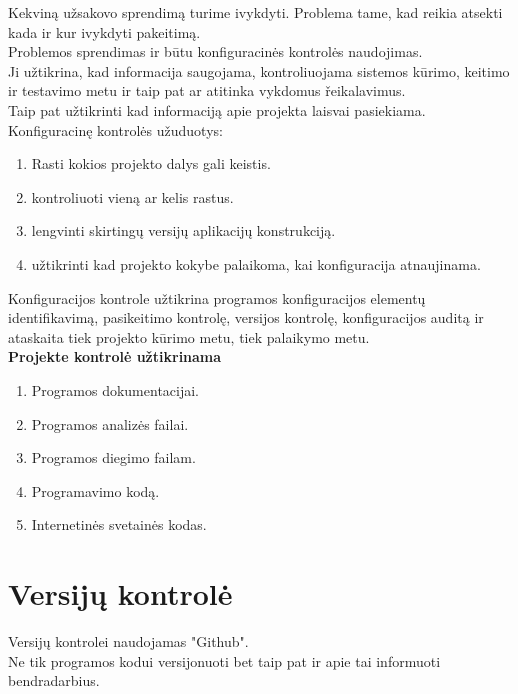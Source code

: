 \documentclass[a4paper,12pt]{article}
\begin{document}
Kekvin\k a u\v zsakovo sprendim\k a turime ivykdyti. Problema tame, kad reikia atsekti kada ir kur ivykdyti pakeitim\k a.\\
Problemos sprendimas ir b\= utu konfiguracin\. es kontrol\. es naudojimas.\\
Ji u\v ztikrina, kad informacija saugojama, kontroliuojama sistemos k\= urimo, keitimo ir testavimo metu ir taip pat ar atitinka vykdomus \v reikalavimus. \\
Taip pat u\v ztikrinti kad informacij\k a apie projekta laisvai pasiekiama.\\

Konfiguracin\k e kontrol\. es u\v zuduotys:
\begin{enumerate}
	\item Rasti kokios projekto dalys gali keistis.
	\item kontroliuoti vien\k a ar kelis rastus.
	\item lengvinti skirting\k u versij\k u aplikacij\k u konstrukcij\k a. 
	\item u\v ztikrinti kad projekto kokybe palaikoma, kai konfiguracija atnaujinama.
\end{enumerate}

Konfiguracijos kontrole u\v ztikrina programos konfiguracijos element\k u identifikavim\k a, pasikeitimo kontrol\k e, versijos kontrol\k e, konfiguracijos audit\k a ir ataskaita tiek projekto k\= urimo metu, tiek palaikymo metu.\\
\large\textbf{Projekte kontrol\. e u\v ztikrinama}
\normalsize
\begin{enumerate}
	\item Programos dokumentacijai.
	\item Programos analiz\. es failai.
	\item Programos diegimo failam.
	\item Programavimo kodą.
	\item Internetinės svetainės kodas.
\end{enumerate}

\clearpage

\section{Versij\k u kontrol\. e}

Versij\k u kontrolei naudojamas "Github".\\
Ne tik programos kodui versijonuoti bet taip pat ir apie tai informuoti bendradarbius.\\
\end{document}

